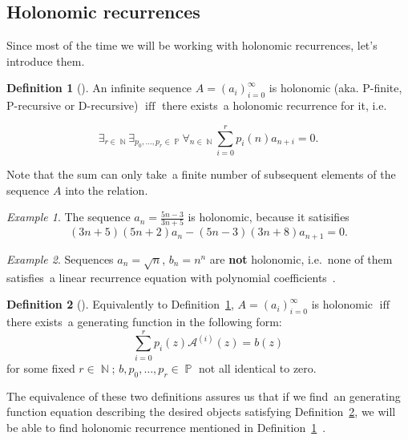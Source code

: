 \documentclass[final]{article}
\theoremstyle{definition}
\newtheorem{definition}{Definition}[subsection]
\theoremstyle{definition}
\theoremstyle{remark}
\newtheorem{example}{Example}[subsection]
\newcommand{\gf}[1]{\ensuremath{\mathcal{#1}}}
\DeclareMathOperator{\textiff}{\text{iff}}
\DeclareMathOperator{\N}{\mathbb{N}}
\DeclareMathOperator{\poly}{\mathbb{P}}
\begin{document}
\subsection{Holonomic recurrences}%
\label{sub:holonomic_recurrences}

Since most of the time we will be working with holonomic recurrences, let's introduce them.

\begin{definition}[\cite{holotoolkit}]
    \label{def:holo_1}
    An infinite sequence \(A = (a_i)_{i=0}^{\infty}\) is holonomic (aka. P-finite, P-recursive or D-recursive) \(\textiff\) there exists~a holonomic recurrence for it, i.e.

\[\exists_{r \in \N} \exists_{p_0, \ldots, p_r \in \poly} \forall_{n \in \N} \sum_{i=0}^r p_i(n)a_{n+i} = 0 .\]
\end{definition}

Note that the sum can only take~a finite number of subsequent elements of the sequence \(A\) into the relation.

\begin{example}
    The sequence \(a_n = \frac{5n - 3}{3n + 5}\) is holonomic, because it satisifies
    \[(3n + 5)(5n + 2) a_n - (5n - 3)(3n + 8) a_{n+1} = 0 .\]
\end{example}

\begin{example}
    Sequences \(a_n = \sqrt{n}\), \(b_n = n^n\) are \textbf{not} holonomic, i.e.~none of them satisfies~a linear recurrence equation with polynomial coefficients~\cite{nonholo}.
\end{example}

\begin{definition}[\cite{complexity}]
    \label{def:holo_2}
    Equivalently to Definition~\ref{def:holo_1}, \(A = (a_i)_{i=0}^{\infty}\) is holonomic \(\textiff\) there exists~a generating function in the following form:
    \[\sum_{i=0}^{r} p_i(z) \gf{A}^{(i)}(z) = b(z)\]
    for some fixed \(r \in \N\); \(b, p_0, \ldots, p_r \in \poly\) not all identical to zero.
\end{definition}

The equivalence of these two definitions assures us that if we find~an generating function equation describing the desired objects satisfying Definition~\ref{def:holo_2}, we will be able to find holonomic recurrence mentioned in Definition~\ref{def:holo_1}~\cite{complexity}.
\end{document}
